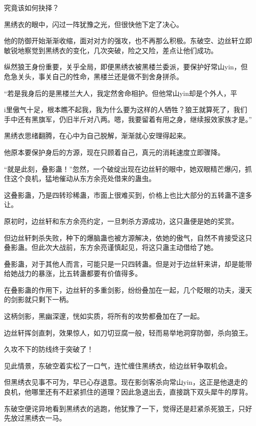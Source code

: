\begin{this_body}
究竟该如何抉择？

黑绣衣的眼中，闪过一阵犹豫之光，但很快他下定了决心。

他的防御开始渐渐收缩，面对对方的强攻，也不再那么积极。东破空、边丝轩立即敏锐地察觉到黑绣衣的变化，几次突破，险之又险，差点让他们成功。

纵然狼王身份重要，关乎全局，即便黑绣衣被黑楼兰委派，要保护好常山yin，但危急关头，事关自己的性命，黑楼兰还是做不到舍身拼杀。

“若是我身后的是黑楼兰大人，我定然舍命相护。但他常山yin却是个外人，平

i里傲气十足，根本瞧不起我，我为什么要为这样的人牺牲？狼王就算死了，我们手中还有黑旗军，仍旧半斤对八两。嗯，我要留着有用之身，继续报效家族才是。”

黑绣衣思绪翻腾，在心中为自己脱解，渐渐就心安理得起来。

他原本要保护身后的方源，现在只顾着自己，真元的消耗速度立即骤降。

“就是此刻，叠影蛊！”忽然，一个破绽出现在边丝轩的眼中，她双眼精芒爆闪，抓住这个良机，猛地催动从东方余亮处借来的蛊虫。

这叠影蛊，乃是四转珍稀蛊，市面上很难买到，价格上也比大部分的五转蛊不遑多让。

原初时，边丝轩和东方余亮约定，一旦刺杀方源成功，这只蛊便是她的奖赏。

但边丝轩刺杀失败，种下的爆脑蛊也被方源解决，依她的傲气，自然不肯接受这只叠影蛊。但此次大战前，东方余亮谨慎起见，将这只蛊主动借给了她。

叠影蛊，对于其他人而言，可能只是一只四转蛊。但是对于边丝轩来讲，却是能带给她战力的暴涨，比五转蛊都要有价值得多。

在叠影蛊的作用下，边丝轩的多重剑影，纷纷叠加在一起，几个眨眼的功夫，漫天的剑影就只剩下一柄。

这柄剑影，黑幽深邃，恍如实质，将所有的攻势都叠加在了一起。

边丝轩挥剑直刺，效果惊人，如刀切豆腐一般，轻而易举地洞穿防御，杀向狼王。

久攻不下的防线终于突破了！

见此情景，东破空着实松了一口气，连忙缠住黑绣衣，给边丝轩争取机会。

但黑绣衣见事不可为，早已心存退意。现在影剑客杀向常山yin，这正是他退走的良机，他哪里还有不赶紧抓住的道理？因此急退出去，直接跳下双头犀牛的厚背。

东破空便诧异地看到黑绣衣的逃跑，他犹豫了一下，觉得还是赶紧杀死狼王，只好先放过黑绣衣一马。


\end{this_body}
